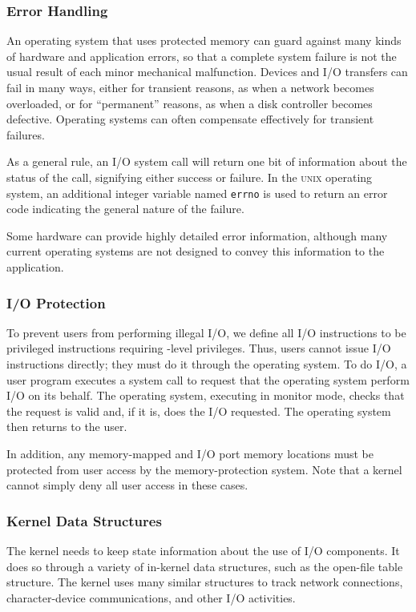 \subsubsection{Error Handling}\label{subsubsec:IO_Error_Handling}
An operating system that uses protected memory can guard against many kinds of hardware and application errors, so that a complete system failure is not the usual result of each minor mechanical malfunction.
Devices and I/O transfers can fail in many ways, either for transient reasons, as when a network becomes overloaded, or for ``permanent'' reasons, as when a disk controller becomes defective.
Operating systems can often compensate effectively for transient failures.

As a general rule, an I/O system call will return one bit of information about the status of the call, signifying either success or failure.
In the \textsc{unix} operating system, an additional integer variable named \texttt{errno} is used to return an error code indicating the general nature of the failure.

Some hardware can provide highly detailed error information, although many current operating systems are not designed to convey this information to the application.

\subsubsection{I/O Protection}\label{subsubsec:IO_Protection}
To prevent users from performing illegal I/O, we define all I/O instructions to be privileged instructions requiring -level privileges.
Thus, users cannot issue I/O instructions directly; they must do it through the operating system.
To do I/O, a user program executes a system call to request that the operating system perform I/O on its behalf.
The operating system, executing in monitor mode, checks that the request is valid and, if it is, does the I/O requested.
The operating system then returns to the user.

In addition, any memory-mapped and I/O port memory locations must be protected from user access by the memory-protection system.
Note that a kernel cannot simply deny all user access in these cases.

\subsubsection{Kernel Data Structures}\label{subsubsec:Kernel_Data_Structures}
The kernel needs to keep state information about the use of I/O components.
It does so through a variety of in-kernel data structures, such as the open-file table structure.
The kernel uses many similar structures to track network connections, character-device communications, and other I/O activities.


